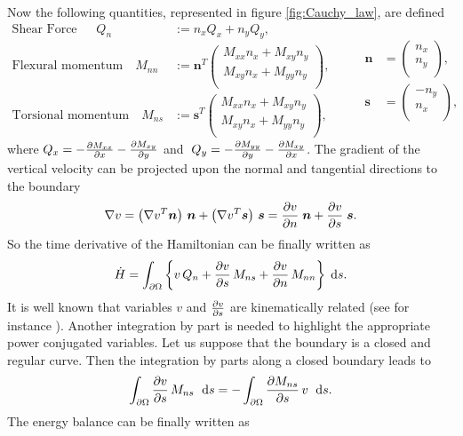 \documentclass[preprint,12pt]{elsarticle}
\begin{document}
	Now the following quantities, represented in figure \ref{fig:Cauchy_law}, are defined 
	\begin{equation}
	\label{eq:QnMnnMns}
	\begin{aligned}
	\text{Shear Force} \; \; \quad Q_{n} &:= n_x Q_x + n_y Q_y,   \\
	\text{Flexural momentum} \quad 
	M_{nn} &:= \bm{n}^T	
	\begin{pmatrix}
	M_{xx} n_x + M_{xy} n_y \\
	M_{xy} n_x + M_{yy} n_y \\
	\end{pmatrix}, \\
	\text{Torsional momentum} \quad M_{ns} &:= \bm{s}^T	
	\begin{pmatrix}
	M_{xx} n_x + M_{xy} n_y \\
	M_{xy} n_x + M_{yy} n_y \\
	\end{pmatrix}, 
	\end{aligned} \qquad
	\begin{aligned}
	\bm{n} &= 
	\begin{pmatrix}
	n_x \\
	n_y \\
	\end{pmatrix}, \\
	\bm{s} &= 
	\begin{pmatrix}
	-n_y \\
	n_x \\
	\end{pmatrix},
	\end{aligned}
	\end{equation}
	where $Q_x = - \diffp{M_{xx}}{x} -\diffp{M_{xy}}{y}$ and $\; Q_y = - \diffp{M_{yy}}{y} -\diffp{M_{xy}}{x}$. The gradient of the vertical velocity can be projected upon the normal and tangential directions to the boundary
	\begin{equation}
	\label{eq:gr_dec_ns}
	\nabla v = \left(\nabla v^T \bm{n} \right) \,\bm{n} + \left(\nabla v^T \bm{s} \right) \, \bm{s} = \diffp{v}{n} \; \bm{n} +   \diffp{v}{s} \; \bm{s}.
	\end{equation}
	So the time derivative of the Hamiltonian can be finally written as
	\begin{equation}
	\dot{H} = \int_{\partial \Omega} \left\{ v \, Q_n + \diffp{v}{s} \, M_{ns} + \diffp{v}{n} \, M_{nn}\right\} \d{s}.
	\end{equation}
	It is well known that variables $v$ and $\diffp{v}{s}$ are kinematically related (see for instance \cite{timoshenko1959theory}). Another integration by part is needed to highlight the appropriate power conjugated variables. Let us suppose that the boundary is a closed and regular curve. Then the integration by parts along a closed boundary leads to
	\begin{equation}
	\int_{\partial \Omega} \diffp{v}{s} \, M_{ns} \ \d{s}= - \int_{\partial \Omega} \diffp{M_{ns}}{s} \, v \ \d{s}.
	\end{equation}
	The energy balance can be finally written as
	
\end{document}
